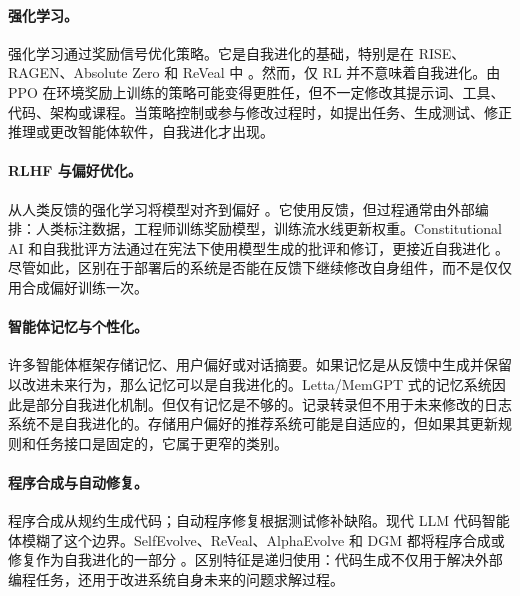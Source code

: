\paragraph{强化学习。} 强化学习通过奖励信号优化策略。它是自我进化的基础，特别是在 RISE、RAGEN、Absolute Zero 和 ReVeal 中 \cite{qu2024rise,wang2025ragen,absolutezero2025,reveal2025}。然而，仅 RL 并不意味着自我进化。由 PPO 在环境奖励上训练的策略可能变得更胜任，但不一定修改其提示词、工具、代码、架构或课程。当策略控制或参与修改过程时，如提出任务、生成测试、修正推理或更改智能体软件，自我进化才出现。

\paragraph{RLHF 与偏好优化。} 从人类反馈的强化学习将模型对齐到偏好 \cite{christiano2017deep,ziegler2019fine}。它使用反馈，但过程通常由外部编排：人类标注数据，工程师训练奖励模型，训练流水线更新权重。Constitutional AI 和自我批评方法通过在宪法下使用模型生成的批评和修订，更接近自我进化 \cite{constitutionalai2022}。尽管如此，区别在于部署后的系统是否能在反馈下继续修改自身组件，而不是仅仅用合成偏好训练一次。

\paragraph{智能体记忆与个性化。} 许多智能体框架存储记忆、用户偏好或对话摘要。如果记忆是从反馈中生成并保留以改进未来行为，那么记忆可以是自我进化的。Letta/MemGPT 式的记忆系统因此是部分自我进化机制。但仅有记忆是不够的。记录转录但不用于未来修改的日志系统不是自我进化的。存储用户偏好的推荐系统可能是自适应的，但如果其更新规则和任务接口是固定的，它属于更窄的类别。

\paragraph{程序合成与自动修复。} 程序合成从规约生成代码；自动程序修复根据测试修补缺陷。现代 LLM 代码智能体模糊了这个边界。SelfEvolve、ReVeal、AlphaEvolve 和 DGM 都将程序合成或修复作为自我进化的一部分 \cite{selfevolve2023,reveal2025,alphaevolve2025,darwingodelmachine2025}。区别特征是递归使用：代码生成不仅用于解决外部编程任务，还用于改进系统自身未来的问题求解过程。

